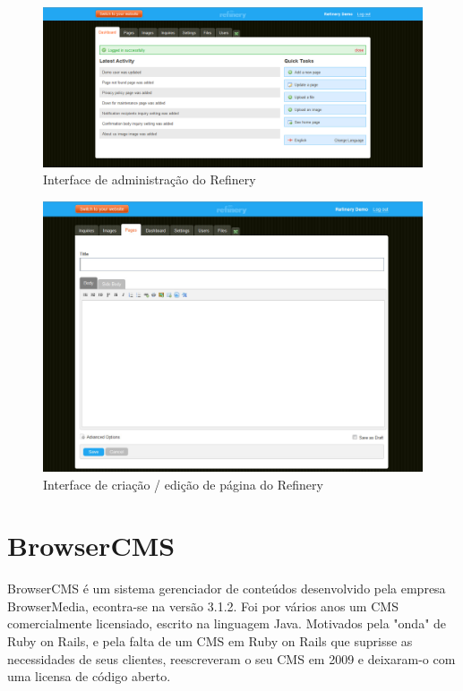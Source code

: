\begin{figure}[here]
\includegraphics[width=150mm]{images/refinery_admin.png}
\caption{Interface de administração do Refinery}
\label{fig:refinery_admin.png}
\end{figure}

\begin{figure}[here]
\includegraphics[width=150mm]{images/refinery_new_page.jpg}
\caption{Interface de criação / edição de página do Refinery}
\label{fig:refinery_new_page.jpg}
\end{figure}

\section{BrowserCMS}

BrowserCMS é um sistema gerenciador de conteúdos desenvolvido pela empresa BrowserMedia, econtra-se na versão 3.1.2. Foi por vários anos um CMS comercialmente licensiado, escrito na linguagem Java. Motivados pela "onda" de Ruby on Rails, e pela falta de um CMS em Ruby on Rails que suprisse as necessidades de seus clientes, reescreveram o seu CMS em 2009 e deixaram-o com uma licensa de código aberto.

